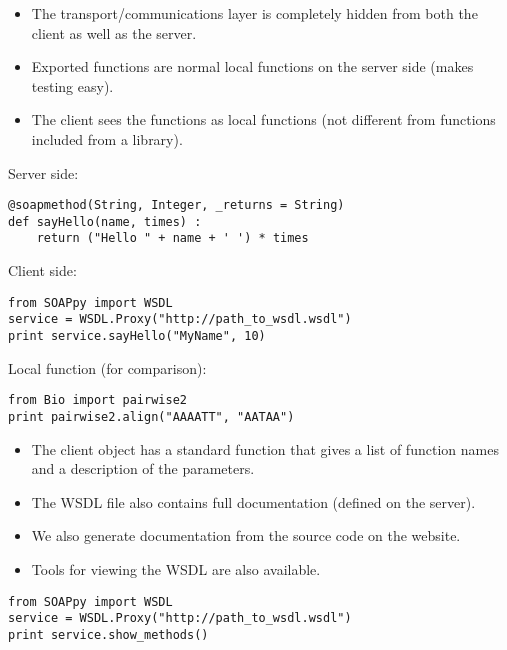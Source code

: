 \documentclass[a4, portrait]{seminar}
\begin{document}
\begin{slide}
\scalebox{0.55}{
\hspace{1.4cm} 
}
\vfill
\end{slide}

\begin{slide}
\vspace{1.5cm}
\begin{itemize}
\item The transport/communications layer is completely hidden from both the
      client as well as the server.
\item Exported functions are normal local functions on the server side (makes
      testing easy).
\item The client sees the functions as local functions (not different from
      functions included from a library).
\end{itemize}
\vfill
\end{slide}

\begin{slide}
Server side:
\begin{verbatim}
@soapmethod(String, Integer, _returns = String)
def sayHello(name, times) :
    return ("Hello " + name + ' ') * times
\end{verbatim}

Client side:
\begin{verbatim}
from SOAPpy import WSDL
service = WSDL.Proxy("http://path_to_wsdl.wsdl")
print service.sayHello("MyName", 10)
\end{verbatim}

\vspace{.5cm}
Local function (for comparison):
\begin{verbatim}
from Bio import pairwise2
print pairwise2.align("AAAATT", "AATAA")
\end{verbatim}
\vfill
\end{slide}

\begin{slide}
\vfill
\end{slide}

\begin{slide}
\begin{itemize}
\item The client object has a standard function that gives a list of function
      names and a description of the parameters.
\item The WSDL file also contains full documentation (defined on the server). 
\item We also generate documentation from the source code on the website.
\item Tools for viewing the WSDL are also available.
\end{itemize}

\vspace{.5cm}
\begin{verbatim}
from SOAPpy import WSDL
service = WSDL.Proxy("http://path_to_wsdl.wsdl")
print service.show_methods()
\end{verbatim}
\vfill
\end{slide}
\end{document}
